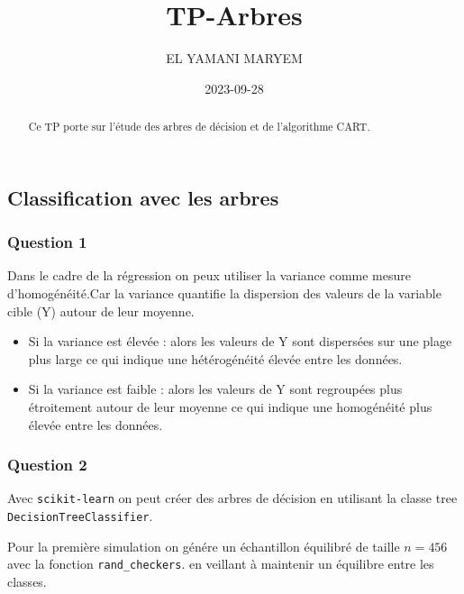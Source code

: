 \documentclass[
  letterpaper,
  DIV=11,
  numbers=noendperiod]{scrartcl}
\title{TP-Arbres}
\author{EL YAMANI MARYEM}
\date{2023-09-28}
\begin{document}
\maketitle
\begin{abstract}
Ce TP porte sur l'étude des arbres de décision et de l'algorithme CART.
\end{abstract}
\ifdefined\Shaded\renewenvironment{Shaded}{\begin{tcolorbox}[breakable, interior hidden, borderline west={3pt}{0pt}{shadecolor}, boxrule=0pt, enhanced, frame hidden, sharp corners]}{\end{tcolorbox}}\fi

\hypertarget{classification-avec-les-arbres}{%
\subsection{Classification avec les
arbres}\label{classification-avec-les-arbres}}

\hypertarget{question-1}{%
\subsubsection{\texorpdfstring{Question 1
}{Question 1 }}\label{question-1}}

Dans le cadre de la régression on peux utiliser la variance comme mesure
d'homogénéité.Car la variance quantifie la dispersion des valeurs de la
variable cible (Y) autour de leur moyenne.

\begin{itemize}
\item
  Si la variance est élevée : alors les valeurs de Y sont dispersées sur
  une plage plus large ce qui indique une hétérogénéité élevée entre les
  données.
\item
  Si la variance est faible : alors les valeurs de Y sont regroupées
  plus étroitement autour de leur moyenne ce qui indique une homogénéité
  plus élevée entre les données.
\end{itemize}

\hypertarget{question-2}{%
\subsubsection{\texorpdfstring{Question 2
}{Question 2 }}\label{question-2}}

Avec \texttt{scikit-learn} on peut créer des arbres de décision en
utilisant la classe tree \texttt{DecisionTreeClassifier}.

Pour la première simulation on génére un échantillon équilibré de taille
\(n = 456\) avec la fonction \texttt{rand\_checkers}. en veillant à
maintenir un équilibre entre les classes.
\end{document}
